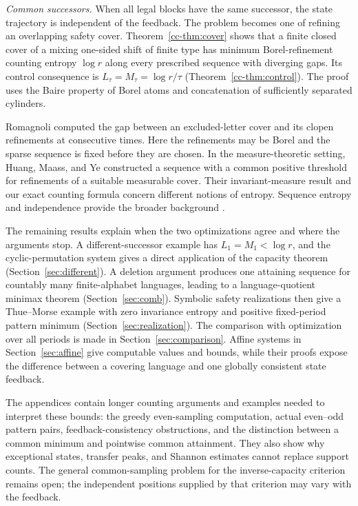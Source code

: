 \documentclass[11pt,reqno]{amsart}
\numberwithin{equation}{section}
\theoremstyle{definition}
\begin{document}
\emph{Common successors.}
When all legal blocks have the same successor, the state trajectory
is independent of the feedback. The problem becomes one of refining
an overlapping safety cover. Theorem~\ref{cc-thm:cover} shows that a
finite closed cover of a mixing one-sided shift of finite type has
minimum Borel-refinement counting entropy $\log r$ along every
prescribed sequence with diverging gaps. Its control consequence is
$L_\tau=M_\tau=\log r/\tau$
(Theorem~\ref{cc-thm:control}). The proof uses the Baire property of
Borel atoms and concatenation of sufficiently separated cylinders.

Romagnoli \cite{Romagnoli2007} computed the gap between an
excluded-letter cover and its clopen refinements at consecutive times.
Here the refinements may be Borel and the sparse sequence is fixed
before they are chosen. In the measure-theoretic setting, Huang,
Maass, and Ye \cite[Lemma~3.3 and Theorem~3.5]{HuangMaassYe2004}
constructed a sequence with a common positive threshold for refinements
of a suitable measurable cover. Their invariant-measure result and
our exact counting formula concern different notions of entropy.
Sequence entropy and independence provide the broader background
\cite{Goodman1974,Hulse1982,KamaeZamboniSystems2002,KL2007,KL2009}.

The remaining results explain when the two optimizations agree and
where the arguments stop. A different-successor example has
$L_1=M_1<\log r$, and the cyclic-permutation system gives a direct
application of the capacity theorem (Section~\ref{sec:different}).
A deletion argument produces one attaining sequence for countably
many finite-alphabet languages, leading to a language-quotient minimax
theorem (Section~\ref{sec:comb}). Symbolic safety realizations then
give a Thue--Morse example with zero invariance entropy and positive
fixed-period pattern minimum (Section~\ref{sec:realization}). The
comparison with optimization over all periods is made in
Section~\ref{sec:comparison}. Affine systems in
Section~\ref{sec:affine} give computable values and bounds, while
their proofs expose the difference between a covering language and
one globally consistent state feedback.

The appendices contain longer counting arguments and examples needed
to interpret these bounds: the greedy even-sampling computation,
actual even--odd pattern pairs, feedback-consistency obstructions,
and the distinction between a common minimum and pointwise common
attainment. They also show why exceptional states, transfer peaks,
and Shannon estimates cannot replace support counts. The general
common-sampling problem for the inverse-capacity criterion remains
open; the independent positions supplied by that criterion may vary
with the feedback.
\end{document}
